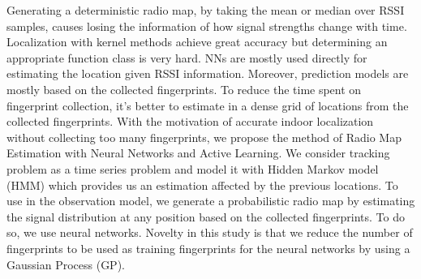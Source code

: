 \documentclass[conference]{IEEEtran}
\begin{document}
{	%
	Generating a deterministic radio map, by taking the mean or median over RSSI samples, causes losing the information of how signal strengths change with time. Localization with kernel methods achieve great accuracy \cite{Roo2002} but determining an appropriate function class is very hard. NNs are mostly used directly for estimating the location given RSSI information. Moreover, prediction models are mostly based on the collected fingerprints. To reduce the time spent on fingerprint collection, it's better to estimate in a dense grid of locations from the collected fingerprints. With the motivation of accurate indoor localization without collecting too many fingerprints, we propose the method of Radio Map Estimation with Neural Networks and Active Learning. We consider tracking problem as a time series problem and model it with Hidden Markov model (HMM) which provides us an estimation affected by the previous locations. To use in the observation model, we generate a probabilistic radio map by estimating the signal distribution at any position based on the collected fingerprints. To do so, we use neural networks. Novelty in this study is that we reduce the number of fingerprints to be used as training fingerprints for the neural networks by using a Gaussian Process (GP). %
	
}
\end{document}
